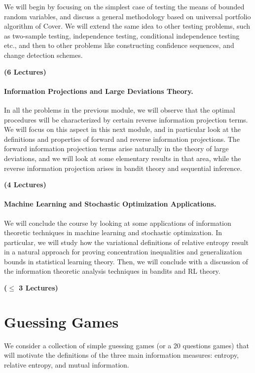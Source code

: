\documentclass[12pt]{article}
\begin{document}
We will begin by focusing on the simplest case of testing the means of bounded random variables, and discuss a general methodology based on universal portfolio algorithm of Cover. We will extend the same idea to other testing problems, such as two-sample testing, independence testing, conditional independence testing etc., and then to other problems like constructing confidence sequences, and change detection schemes.

\hfill \textbf{(6 Lectures)}

\paragraph{Information Projections and Large Deviations Theory.} In all the problems in the previous module, we will observe that the optimal procedures will be characterized by certain reverse information projection terms. We will focus on this aspect in this next module, and in particular look at the definitions and properties of forward and reverse information projections. The forward information projection terms arise naturally in the theory of large deviations, and we will look at some elementary results in that area, while the reverse information projection arises in bandit theory and sequential inference.  

\hfill \textbf{(4 Lectures)}

\paragraph{Machine Learning and Stochastic Optimization Applications.}  We will conclude the course by looking at some applications of information theoretic techniques in machine learning and stochastic optimization. In particular, we will study how the variational definitions of relative entropy result in a natural approach for proving concentration inequalities and generalization bounds in statistical learning theory. Then, we will conclude with a discussion of the information theoretic analysis techniques in bandits and RL theory. 

\hfill \textbf{($\mathbf{\leq}$ 3 Lectures)}

\section{Guessing Games}
 We consider a collection of simple guessing games (or a 20 questions games)  that will motivate the definitions of the three main information measures: entropy, relative entropy, and mutual information. 
\end{document}

